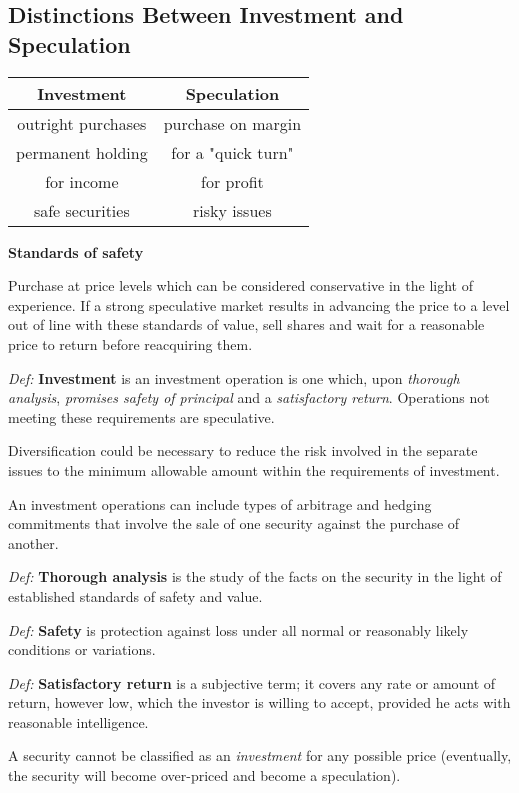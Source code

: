 \documentclass{article}
\newcommand*{\defn}[1]{\textit{Def:} \textbf{#1}}
\begin{document}
\subsection{Distinctions Between Investment and Speculation}
\begin{center}
  \begin{tabular}{ c | c }
    \textbf{Investment} & \textbf{Speculation} \\ \hline
    outright purchases & purchase on margin \\ \hline
    permanent holding & for a "quick turn" \\ \hline
    for income & for profit \\ \hline
    safe securities & risky issues
  \end{tabular}
\end{center}
\textbf{Standards of safety}
\par
Purchase at price levels which can be considered conservative in the light of experience. If a strong speculative market results in advancing the price to a level out of line with these standards of value, sell shares and wait for a reasonable price to return before reacquiring them.
\par
\defn{Investment} is an investment operation is one which, upon \textit{thorough analysis}, \textit{promises safety of principal} and a \textit{satisfactory return}. Operations not meeting these requirements are speculative.
\par
Diversification could be necessary to reduce the risk involved in the separate issues to the minimum allowable amount within the requirements of investment.
\par
An investment operations can include types of arbitrage and hedging commitments that involve the sale of one security against the purchase of another.
\par
\defn{Thorough analysis} is the study of the facts on the security in the light of established standards of safety and value.
\par
\defn{Safety} is protection against loss under all normal or reasonably likely conditions or variations.
\par
\defn{Satisfactory return} is a subjective term; it covers any rate or amount of return, however low, which the investor is willing to accept, provided he acts with reasonable intelligence.
\par
A security cannot be classified as an \textit{investment} for any possible price (eventually, the security will become over-priced and become a speculation).
\end{document}
